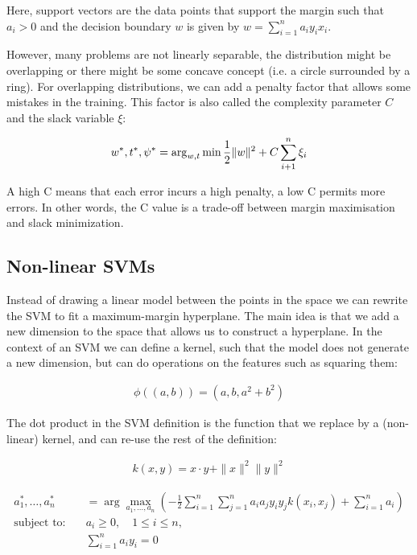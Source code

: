 Here, support vectors are the data points that support the margin
such that $a_i > 0$ and the decision boundary $w$ is given by $w =
\sum_{i=1}^n a_iy_ix_i$.

However, many problems are not linearly separable, the distribution
might be overlapping or there might be some concave concept (i.e. a circle
surrounded by a ring). For overlapping distributions, we can add a penalty
factor that allows some mistakes in the training. This factor is also called
the complexity parameter $C$ and the slack variable $\xi$:

\begin{align*}
  w^*, t^*, \psi^* = \arg_{w,t} \min \frac{1}{2} \lVert w\rVert^2 + C
  \sum_{i+1}^n \xi_i
\end{align*}

A high C means that each error incurs a high penalty, a low C permits
more errors. In other words, the C value is a trade-off between margin
maximisation and slack minimization.

\subsection{Non-linear SVMs}

Instead of drawing a linear model between the points in the space we
can rewrite the SVM to fit a maximum-margin hyperplane. The main idea
is that we add a new dimension to the space that allows us to construct
a hyperplane. In the context of an SVM we can define a kernel, such that
the model does not generate a new dimension, but can do operations on
the features such as squaring them:

\begin{align*}
  \phi\left(\left(a, b\right)\right) = (a, b, a^2 + b^2)
\end{align*}

The dot product in the SVM definition is the function that we replace
by a (non-linear) kernel, and can re-use the rest of the definition:

\begin{align*}
  k(x, y) = x \cdot y + \|x\|^2 \|y\|^2
\end{align*}

\begin{definition}
  \begin{align*}
    a_1^*, \ldots, a_n^* &= \arg\max_{a_1,\ldots,a_n} \left(
      -\frac{1}{2} \sum_{i=1}^n \sum_{j=1}^n a_i a_j y_i y_j k(x_i, x_j)
    + \sum_{i=1}^n a_i \right) \\
    \text{subject to:} \quad &a_i \geq 0, \quad 1 \leq i \leq n, \\
    &\sum_{i=1}^n a_i y_i = 0
  \end{align*}
\end{definition}

